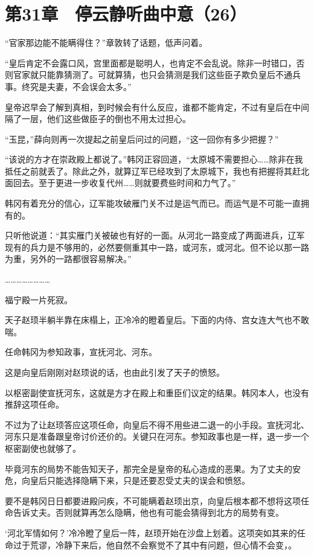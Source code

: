 \section{第31章　停云静听曲中意（26）}

“官家那边能不能瞒得住？”章敦转了话题，低声问着。

“皇后肯定不会露口风，宫里面都是聪明人，也肯定不会乱说。除非一时错口，否则官家就只能靠猜测了。可就算猜，也只会猜测是我们这些臣子欺负皇后不通兵事。终究是夫妻，不会误会太多。”

皇帝迟早会了解到真相，到时候会有什么反应，谁都不能肯定，不过有皇后在中间隔了一层，他们这些做臣子的倒也不用太过担心。

“玉昆，”薛向则再一次提起之前皇后问过的问题，“这一回你有多少把握？”

“该说的方才在崇政殿上都说了。”韩冈正容回道，“太原城不需要担心……除非在我抵任之前就丢了。除此之外，就算辽军已经攻到了太原城下，我也有把握将其赶北面回去。至于更进一步收复代州……则就要费些时间和力气了。”

韩冈有着充分的信心，辽军能攻破雁门关不过是运气而已。而运气是不可能一直拥有的。

只听他说道：“其实雁门关被破也有好的一面。从河北一路变成了两面进兵，辽军现有的兵力是不够用的，必然要侧重其中一路，或河东，或河北。但不论以那一路为重，另外的一路都很容易解决。”

……………………

福宁殿一片死寂。

天子赵顼半躺半靠在床榻上，正冷冷的瞪着皇后。下面的内侍、宫女连大气也不敢喘。

任命韩冈为参知政事，宣抚河北、河东。

这是向皇后刚刚对赵顼说的话，也由此引发了天子的愤怒。

以枢密副使宣抚河东，这就是方才在殿上和重臣们议定的结果。韩冈本人，也没有推辞这项任命。

不过为了让赵顼答应这项任命，向皇后不得不用些进二退一的小手段。宣抚河北、河东只是准备跟皇帝讨价还价的。关键只在河东。参知政事也是一样，退一步一个枢密副使也就够了。

毕竟河东的局势不能告知天子，那完全是皇帝的私心造成的恶果。为了丈夫的安危，向皇后只能选择隐瞒下来，只是还要忍受丈夫的误会和愤怒。

要不是韩冈日日都要进殿问疾，不可能瞒着赵顼出京，向皇后根本都不想将这项任命告诉丈夫。否则就算再怎么隐瞒，他也有可能会猜得到北方的局势有变。

‘河北军情如何？’冷冷瞪了皇后一阵，赵顼开始在沙盘上划着。这项突如其来的任命过于荒谬，冷静下来后，他自然不会察觉不了其中有问题，但心情不会变，。


